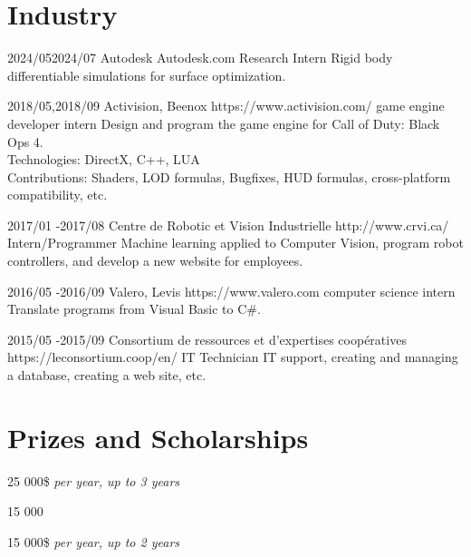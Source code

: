 \documentclass[10pt]{article} %
\begin{document}
\section{Industry}

\job
{2024/05}{2024/07}
{Autodesk}
{Autodesk.com}
{Research Intern}
{Rigid body differentiable simulations for surface optimization.}

\job
{2018/05,}{2018/09}
{Activision, Beenox}
{https://www.activision.com/}
{game engine developer intern}
{Design and program the game engine for Call of Duty: Black Ops 4.\\
 Technologies: DirectX, C++, LUA \\
 Contributions: Shaders, LOD formulas, Bugfixes, HUD formulas, cross-platform compatibility, etc.}


\job
{2017/01 -}{2017/08}
{Centre de Robotic et Vision Industrielle}
{http://www.crvi.ca/}
{Intern/Programmer}
{Machine learning applied to Computer Vision, program robot controllers, and develop a new website for employees.}

\job
{2016/05 -}{2016/09}
{Valero, Levis}
{https://www.valero.com}
{computer science intern}
{Translate programs from Visual Basic to C\#.}

\job
{2015/05 -}{2015/09}
{Consortium de ressources et d'expertises coopératives}
{https://leconsortium.coop/en/}
{IT Technician}
{IT support, creating and managing a database, creating a web site, etc.}


\section{Prizes and Scholarships}

{
 25 000\$ \textit{per year, up to 3 years} \\
}

{
 15 000 \\
}

{
 15 000\$ \textit{per year, up to 2 years} \\
}
\end{document}
